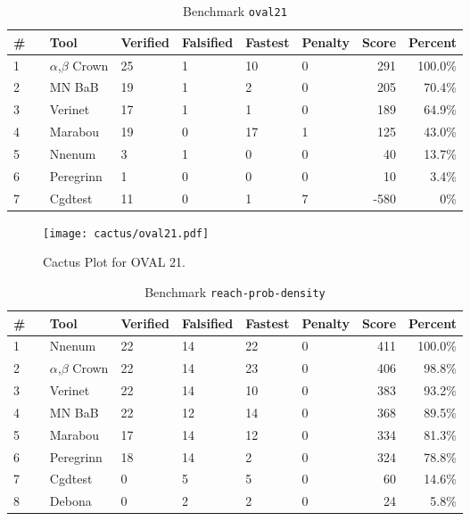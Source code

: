 \begin{table}[h]
\begin{center}
\caption{Benchmark \texttt{oval21}} \label{tab:cat_{cat}}
{\setlength{\tabcolsep}{2pt}
\begin{tabular}[h]{@{}llllllrr@{}}
\toprule
\textbf{\# ~} & \textbf{Tool} & \textbf{Verified} & \textbf{Falsified} & \textbf{Fastest} & \textbf{Penalty} & \textbf{Score} & \textbf{Percent}\\
\midrule
1 & $\alpha$,$\beta$ Crown & 25 & 1 & 10 & 0 & 291 & 100.0\% \\
2 & MN BaB & 19 & 1 & 2 & 0 & 205 & 70.4\% \\
3 & Verinet & 17 & 1 & 1 & 0 & 189 & 64.9\% \\
4 & Marabou & 19 & 0 & 17 & 1 & 125 & 43.0\% \\
5 & Nnenum & 3 & 1 & 0 & 0 & 40 & 13.7\% \\
6 & Peregrinn & 1 & 0 & 0 & 0 & 10 & 3.4\% \\
7 & Cgdtest & 11 & 0 & 1 & 7 & -580 & 0\% \\
\bottomrule
\end{tabular}
}
\end{center}
\end{table}



\begin{figure}[h]
\centerline{\texttt{[image: cactus/oval21.pdf]}}
\caption{Cactus Plot for OVAL 21.}
\label{fig:quantPic}
\end{figure}



\begin{table}[h]
\begin{center}
\caption{Benchmark \texttt{reach-prob-density}} \label{tab:cat_{cat}}
{\setlength{\tabcolsep}{2pt}
\begin{tabular}[h]{@{}llllllrr@{}}
\toprule
\textbf{\# ~} & \textbf{Tool} & \textbf{Verified} & \textbf{Falsified} & \textbf{Fastest} & \textbf{Penalty} & \textbf{Score} & \textbf{Percent}\\
\midrule
1 & Nnenum & 22 & 14 & 22 & 0 & 411 & 100.0\% \\
2 & $\alpha$,$\beta$ Crown & 22 & 14 & 23 & 0 & 406 & 98.8\% \\
3 & Verinet & 22 & 14 & 10 & 0 & 383 & 93.2\% \\
4 & MN BaB & 22 & 12 & 14 & 0 & 368 & 89.5\% \\
5 & Marabou & 17 & 14 & 12 & 0 & 334 & 81.3\% \\
6 & Peregrinn & 18 & 14 & 2 & 0 & 324 & 78.8\% \\
7 & Cgdtest & 0 & 5 & 5 & 0 & 60 & 14.6\% \\
8 & Debona & 0 & 2 & 2 & 0 & 24 & 5.8\% \\
\bottomrule
\end{tabular}
}
\end{center}
\end{table}



